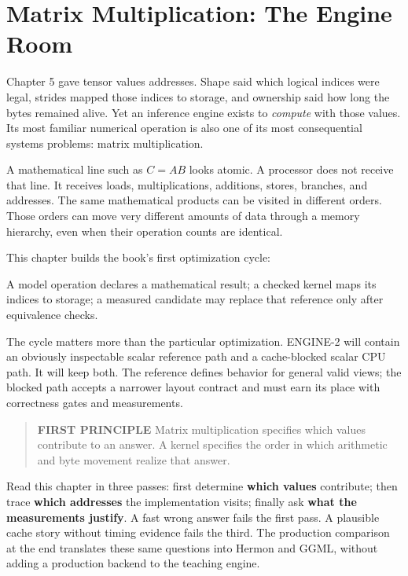 \chapter{Matrix Multiplication: The Engine Room}\label{chapter-6-matrix-multiplication-the-engine-room}
Chapter 5 gave tensor values addresses. Shape said which logical indices
were legal, strides mapped those indices to storage, and ownership said
how long the bytes remained alive. Yet an inference engine exists to
\emph{compute} with those values. Its most familiar numerical operation
is also one of its most consequential systems problems: matrix
multiplication.

A mathematical line such as \(C=AB\) looks atomic. A processor does not
receive that line. It receives loads, multiplications, additions,
stores, branches, and addresses. The same mathematical products can be
visited in different orders. Those orders can move very different
amounts of data through a memory hierarchy, even when their operation
counts are identical.

This chapter builds the book's first optimization cycle:

A model operation declares a mathematical result; a checked kernel maps its indices to storage; a measured candidate may replace that reference only after equivalence checks.

The cycle matters more than the particular optimization. ENGINE-2 will
contain an obviously inspectable scalar reference path and a
cache-blocked scalar CPU path. It will keep both. The reference defines
behavior for general valid views; the blocked path accepts a narrower
layout contract and must earn its place with correctness gates and
measurements.

\begin{quote}
\textbf{FIRST PRINCIPLE} Matrix multiplication specifies which values
contribute to an answer. A kernel specifies the order in which
arithmetic and byte movement realize that answer.
\end{quote}


Read this chapter in three passes: first determine \textbf{which values}
contribute; then trace \textbf{which addresses} the implementation
visits; finally ask \textbf{what the measurements justify}. A fast wrong
answer fails the first pass. A plausible cache story without timing
evidence fails the third. The production comparison at the end
translates these same questions into Hermon and GGML, without adding a
production backend to the teaching engine.

